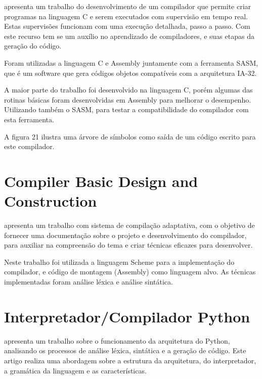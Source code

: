 \documentclass[12pt,oneside,a4paper,chapter=TITLE,section=TITLE,sumario=tradicional]{abntex2}
\begin{document}
\cite{juliano2009} apresenta um trabalho do desenvolvimento de um compilador que permite criar programas na linguagem C e serem executados com supervisão em tempo real. Estas supervisões funcionam com uma execução detalhada, passo a passo. Com este recurso tem se um auxílio no aprendizado de compiladores, e suas etapas da geração do código.

Foram utilizadas a linguagem C e Assembly juntamente com a ferramenta SASM, que é um software que gera códigos objetos compatíveis com a arquitetura IA-32.

A maior parte do trabalho foi desenvolvido na linguagem C, porém algumas das rotinas básicas foram desenvolvidas em Assembly para melhorar o desempenho. Utilizando também o SASM, para testar a compatibilidade do compilador com esta ferramenta.

A figura 21 ilustra uma árvore de símbolos como saída de um código escrito para este compilador. 

\begin{figure}[htb]
\end{figure}

\section{Compiler Basic Design and Construction}
\label{sec:compiler-basic}

\cite{mahak2009} apresenta um trabalho com sistema de compilação adaptativa, com o objetivo de fornecer uma documentação sobre o projeto e desenvolvimento do compilador, para auxiliar na compreensão do tema e criar técnicas eficazes para desenvolver.

Neste trabalho foi utilizada a linguagem Scheme para a implementação do compilador, e código de montagem (Assembly) como linguagem alvo. As técnicas implementadas foram análise léxica e análise sintática.

\section{ Interpretador/Compilador Python}
\label{sec:interpretador-compilador}

\cite{eduardo2010} apresenta um trabalho sobre o funcionamento da arquitetura do Python, analisando os processos de análise léxica, sintática e a geração de código. Este artigo realiza uma abordagem sobre a estrutura da arquitetura, do interpretador, a gramática da linguagem e as características.
 
\end{document}
